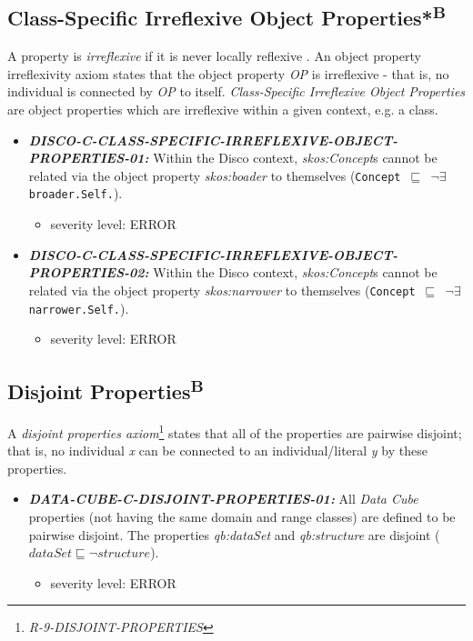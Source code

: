 \documentclass{llncs}
\newcommand{\ms}[1]{\texttt{#1}}
\begin{document}
\subsection{Class-Specific Irreflexive Object Properties*\textsuperscript{B}}

A property is \emph{irreflexive} if it is never locally reflexive \cite{Kroetzsch2012}.
An object property irreflexivity axiom states that the object property \emph{OP} is irreflexive - that is, no individual is connected by \emph{OP} to itself.
\emph{Class-Specific Irreflexive Object Properties} are object properties which are irreflexive within a given context, e.g. a class. 

\begin{itemize}
  \item \textbf{{\em DISCO-C-CLASS-SPECIFIC-IRREFLEXIVE-OBJECT-PROPERTIES-01:}}
Within the Disco context, {\em skos:Concept}s cannot be related via the object property {\em skos:boader} to themselves (\ms{Concept $\sqsubseteq$ $\neg$$\exists$ broader.Self.}). 
	\begin{itemize}
		\item severity level: ERROR
	\end{itemize}
	\item \textbf{{\em DISCO-C-CLASS-SPECIFIC-IRREFLEXIVE-OBJECT-PROPERTIES-02:}}
Within the Disco context, {\em skos:Concept}s cannot be related via the object property {\em skos:narrower} to themselves (\ms{Concept $\sqsubseteq$ $\neg$$\exists$ narrower.Self.}). 
	\begin{itemize}
		\item severity level: ERROR
	\end{itemize}
\end{itemize}

\subsection{Disjoint Properties\textsuperscript{B}}

A \emph{disjoint properties axiom}\footnote{\emph{R-9-DISJOINT-PROPERTIES}} states that all of the properties are pairwise disjoint; 
that is, no individual \emph{x} can be connected to an individual/literal \emph{y} by these properties. 

\begin{itemize}
	\item \textbf{{\em DATA-CUBE-C-DISJOINT-PROPERTIES-01:}} 
	All \emph{Data Cube} properties (not having the same domain and range classes) are defined to be pairwise disjoint.
  The properties \emph{qb:dataSet} and \emph{qb:structure} are disjoint ($dataSet \sqsubseteq \neg structure$).
	\begin{itemize}
		\item severity level: ERROR
	\end{itemize}
\end{itemize}
\end{document}
